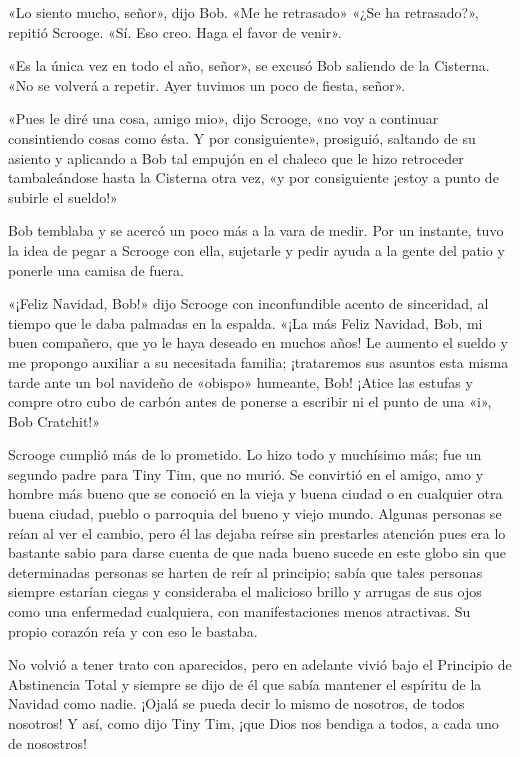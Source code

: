 \documentclass{novela}
\begin{document}
 «Lo siento mucho, señor», dijo Bob. «Me he retrasado» «¿Se ha retrasado?», repitió Scrooge. «Sí. Eso creo. Haga el favor de venir».

 «Es la única vez en todo el año, señor», se excusó Bob saliendo de la Cisterna. «No se volverá a repetir. Ayer tuvimos un poco de fiesta, señor».

 «Pues le diré una cosa, amigo mio», dijo Scrooge, «no voy a continuar consintiendo cosas como ésta. Y por consiguiente», prosiguió, saltando de su asiento y aplicando a Bob tal empujón en el chaleco que le hizo retroceder tambaleándose hasta la Cisterna otra vez, «y por consiguiente ¡estoy a punto de subirle el sueldo!»

 Bob temblaba y se acercó un poco más a la vara de medir. Por un instante, tuvo la idea de pegar a Scrooge con ella, sujetarle y pedir ayuda a la gente del patio y ponerle una camisa de fuera.

 «¡Feliz Navidad, Bob!» dijo Scrooge con inconfundible acento de sinceridad, al tiempo que le daba palmadas en la espalda. «¡La más Feliz Navidad, Bob, mi buen compañero, que yo le haya deseado en muchos años! Le aumento el sueldo y me propongo auxiliar a su necesitada familia; ¡trataremos sus asuntos esta misma tarde ante un bol navideño de «obispo» humeante, Bob! ¡Atice las estufas y compre otro cubo de carbón antes de ponerse a escribir ni el punto de una «i», Bob Cratchit!»

 Scrooge cumplió más de lo prometido. Lo hizo todo y muchísimo más; fue un segundo padre para Tiny Tim, que no murió. Se convirtió en el amigo, amo y hombre más bueno que se conoció en la vieja y buena ciudad o en cualquier otra buena ciudad, pueblo o parroquia del bueno y viejo mundo. Algunas personas se reían al ver el cambio, pero él las dejaba reírse sin prestarles atención pues era lo bastante sabio para darse cuenta de que nada bueno sucede en este globo sin que determinadas personas se harten de reír al principio; sabía que tales personas siempre estarían ciegas y consideraba el malicioso brillo y arrugas de sus ojos como una enfermedad cualquiera, con manifestaciones menos atractivas. Su propio corazón reía y con eso le bastaba.

 No volvió a tener trato con aparecidos, pero en adelante vivió bajo el Principio de Abstinencia Total y siempre se dijo de él que sabía mantener el espíritu de la Navidad como nadie. ¡Ojalá se pueda decir lo mismo de nosotros, de todos nosotros! Y así, como dijo Tiny Tim, ¡que Dios nos bendiga a todos, a cada uno de nosostros!




 \Fin%
\end{document}
